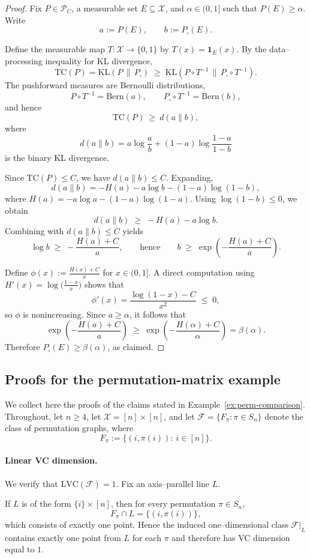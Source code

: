 \documentclass[arxiv]{colt2026}
\newcommand{\X}{\mathcal{X}}
\newcommand{\F}{\mathcal{F}}
\newcommand{\Pc}{\mathcal{P}}
\newcommand{\LVC}{\mathrm{LVC}}
\newcommand{\KL}{\mathrm{KL}}
\begin{document}
\begin{proof}
Fix $P\in\Pc_C$, a measurable set $E\subseteq\X$, and $\alpha\in(0,1]$ such that
$P(E)\ge \alpha$.
Write
\[
a:=P(E),
\qquad
b:=P_{\square}(E).
\]

Define the measurable map $T:\X\to\{0,1\}$ by
\(
T(x)=\mathbf 1_E(x).
\)
By the data--processing inequality for KL divergence,
\[
\mathrm{TC}(P)
=
\KL(P\,\|\,P_{\square})
\;\ge\;
\KL(P\circ T^{-1}\,\|\,P_{\square}\circ T^{-1}).
\]
The pushforward measures are Bernoulli distributions,
\[
P\circ T^{-1}=\mathrm{Bern}(a),
\qquad
P_{\square}\circ T^{-1}=\mathrm{Bern}(b),
\]
and hence
\[
\mathrm{TC}(P)\ \ge\ d(a\|b),
\]
where
\[
d(a\|b)
=
 a\log\frac{a}{b}
 +(1-a)\log\frac{1-a}{1-b}
\]
is the binary KL divergence.

Since $\mathrm{TC}(P)\le C$, we have $d(a\|b)\le C$.
Expanding,
\[
d(a\|b)
=
-H(a)
-a\log b
-(1-a)\log(1-b),
\]
where $H(a)=-a\log a-(1-a)\log(1-a)$.
Using $\log(1-b)\le 0$, we obtain
\[
d(a\|b)
\;\ge\;
-H(a)-a\log b.
\]
Combining with $d(a\|b)\le C$ yields
\[
\log b
\;\ge\;
-\frac{H(a)+C}{a},
\qquad\text{hence}\qquad
b
\;\ge\;
\exp\!\left(-\frac{H(a)+C}{a}\right).
\]

Define $\phi(x):=\frac{H(x)+C}{x}$ for $x\in(0,1]$.
A direct computation using
$H'(x)=\log\!\bigl(\frac{1-x}{x}\bigr)$ shows that
\[
\phi'(x)
=
\frac{\log(1-x)-C}{x^2}
\;\le\;0,
\]
so $\phi$ is nonincreasing.
Since $a\ge\alpha$, it follows that
\[
\exp\!\left(-\frac{H(a)+C}{a}\right)
\;\ge\;
\exp\!\left(-\frac{H(\alpha)+C}{\alpha}\right)
=
\beta(\alpha).
\]
Therefore $P_{\square}(E)\ge\beta(\alpha)$, as claimed.
\end{proof}

\subsection{Proofs for the permutation-matrix example}\label{sec:proof-permutation}
We collect here the proofs of the claims stated in
Example~\ref{ex:perm-comparison}.
Throughout, let $n\ge 4$, let $\X=[n]\times[n]$, and let
$\F=\{F_\pi:\pi\in S_n\}$ denote the class of permutation graphs,
where
\[
F_\pi := \{(i,\pi(i)):\ i\in[n]\}.
\]

\paragraph{Linear VC dimension.}
We verify that $\LVC(\F)=1$.
Fix an axis--parallel line $L$.

If $L$ is of the form $\{i\}\times[n]$, then for every permutation
$\pi\in S_n$,
\[
F_\pi\cap L = \{(i,\pi(i))\},
\]
which consists of exactly one point.
Hence the induced one--dimensional class $\F|_L$ contains exactly one point from
$L$ for each $\pi$ and therefore has VC dimension equal to $1$.
\end{document}
